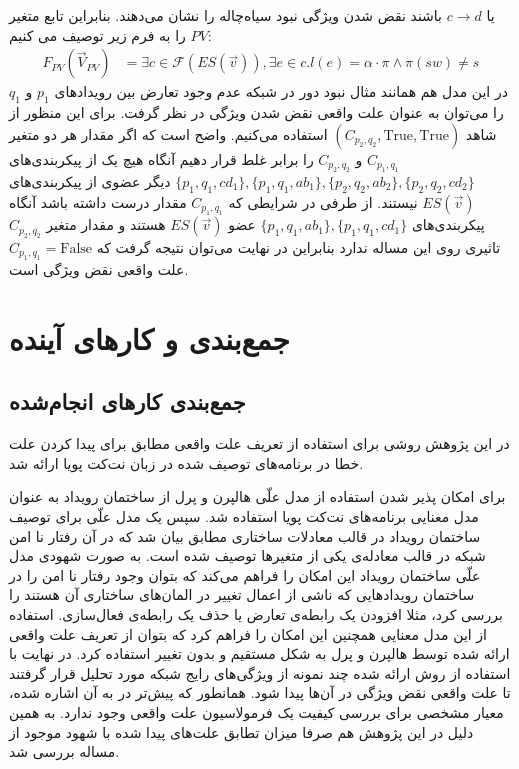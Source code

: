 \documentclass[
msc,
irfonts
]{./tex/tehran-thesis}
\newcommand{\پ}{پروژه/پایان‌نامه/رساله }
\theoremstyle{definition}
\theoremstyle{theorem}
\theoremstyle{definition}
\numberwithin{algorithm}{chapter}
\newcommand{\F}{\mathrm{False}}
\newcommand{\T}{\mathrm{True}}
\newcommand{\s}[1]{\{#1\}}
\newcommand{\ra}{\rightarrow}
\newcommand{\f}[1]{F_{#1}(\vec V_{#1})}
\begin{document}
یا 
$c \ra d$
باشند نقض شدن ویژگی نبود سیاه‌چاله را نشان می‌دهند.
بنابراین تابع متغیر
$PV$
را به فرم زیر توصیف می کنیم:
\begin{align*}
    \f{PV} & = \exists c \in \mathcal{F}(ES(\vec v)),
    \exists e \in c. l(e) =  \alpha\cdot\pi \wedge \pi(sw) \neq s
\end{align*}
در این مدل هم همانند مثال نبود دور در شبکه عدم وجود تعارض بین رویداد‌های 
$p_1$
و
$q_1$
را می‌توان به عنوان علت واقعی نقض شدن ویژگی در نظر گرفت.
برای این منظور از شاهد
$(C_{p_2,q_2},\T,\T)$
استفاده می‌کنیم.
واضح است که اگر مقدار هر دو متغیر
$C_{p_1,q_1}$
و
$C_{p_2,q_2}$
را برابر غلط قرار دهیم آنگاه هیچ یک از پیکر‌بندی‌های 
$\s{p_1,q_1,cd_1},\s{p_1,q_1,ab_1},\s{p_2,q_2,ab_2},\s{p_2,q_2,cd_2}$
دیگر عضوی از پیکربندی‌های 
$ES(\vec v)$
نیستند.
از طرفی در شرایطی که 
$C_{p_1,q_1}$
مقدار درست داشته باشد آنگاه پیکربندی‌های
$\s{p_1,q_1,ab_1},\s{p_1,q_1,cd_1}$
عضو
$ES(\vec v)$
هستند و مقدار متغیر
$C_{p_2,q_2}$
تاثیری روی این مساله ندارد بنابراین در نهایت می‌توان نتیجه گرفت که 
$C_{p_1,q_1} = \F$
علت واقعی نقض ویژگی است. 
 \clearpage{}
\clearpage{}\chapter{جمع‌بندی و کار‌های آینده}
\section{جمع‌بندی کار‌های انجام‌شده}
 در این پژوهش روشی برای استفاده از تعریف علت واقعی مطابق
\cite{hp}
برای پیدا کردن علت خطا در برنامه‌های توصیف شده در زبان نت‌کت پویا ارائه شد.

برای امکان پذیر شدن استفاده از مدل علّی هالپرن و پرل از ساختمان رویداد به عنوان مدل معنایی برنامه‌های نت‌کت پویا استفاده شد.
سپس یک مدل علّی برای توصیف ساختمان رویداد در قالب معادلات ساختاری مطابق
\cite{hp}
بیان شد که در آن رفتار نا امن شبکه در قالب معادله‌ی یکی از متغیر‌ها توصیف شده است.
به صورت شهودی مدل علّی ساختمان رویداد این امکان را فراهم می‌کند که بتوان وجود رفتار نا امن را در ساختمان رویداد‌هایی که ناشی از اعمال تغییر در المان‌های ساختاری آن هستند را بررسی کرد، مثلا افزودن یک رابطه‌ی تعارض یا حذف یک رابطه‌ی فعال‌سازی.
استفاده از این مدل معنایی همچنین این امکان را فراهم کرد که بتوان از تعریف علت واقعی ارائه شده توسط هالپرن و پرل به شکل مستقیم و بدون تغییر استفاده کرد.
در نهایت با استفاده از روش ارائه شده چند نمونه از ویژگی‌های رایج شبکه مورد تحلیل قرار گرفتند تا علت واقعی نقض ویژگی در آن‌ها پیدا شود.
همانطور که پیش‌تر در 
\cite{hp}
به آن اشاره شده، معیار مشخصی برای بررسی کیفیت یک فرمولاسیون علت واقعی وجود ندارد.  
به همین دلیل در این پژوهش هم صرفا میزان تطابق علت‌های پیدا شده با شهود موجود از مساله بررسی شد.  
\end{document}
